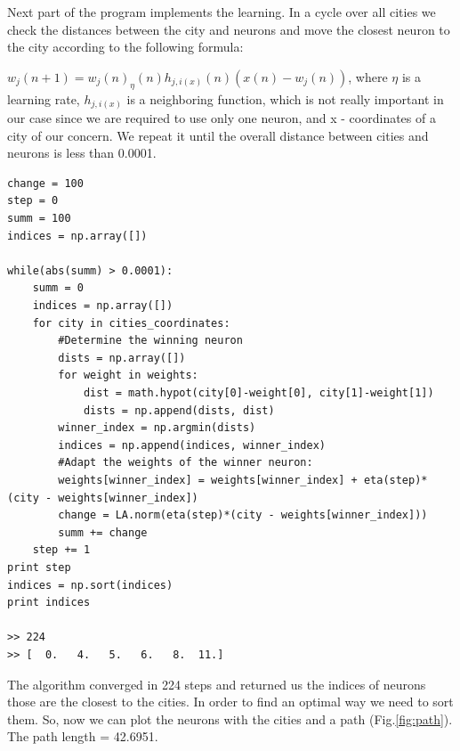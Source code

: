 \documentclass[a4paper, 12pt]{article}
\begin{document}
Next part of the program implements the learning. In a cycle over all cities we check the distances between the city and neurons and move the closest neuron to the city according to the following formula:

$w_j(n+1) = w_j(n) _ \eta(n) h_{j,i(x)}(n)(x(n) - w_j(n))$,
where $\eta$ is a learning rate, $h_{j,i(x)}$ is a neighboring function, which is not really important in our case since we are required to use only one neuron, and x - coordinates of a city of our concern. We repeat it until the overall distance between cities and neurons is less than 0.0001.


\lstset{language=Python}
\begin{lstlisting}[frame=single]
change = 100
step = 0
summ = 100
indices = np.array([])

while(abs(summ) > 0.0001):
    summ = 0
    indices = np.array([])
    for city in cities_coordinates:
        #Determine the winning neuron 
        dists = np.array([])
        for weight in weights:
            dist = math.hypot(city[0]-weight[0], city[1]-weight[1])
            dists = np.append(dists, dist)
        winner_index = np.argmin(dists)
        indices = np.append(indices, winner_index)
        #Adapt the weights of the winner neuron:
        weights[winner_index] = weights[winner_index] + eta(step)*(city - weights[winner_index])
        change = LA.norm(eta(step)*(city - weights[winner_index]))
        summ += change
    step += 1
print step
indices = np.sort(indices)
print indices

>> 224
>> [  0.   4.   5.   6.   8.  11.]
\end{lstlisting}

The algorithm converged in 224 steps and returned us the indices of neurons those are the closest to the cities. In order to find an optimal way we need to sort them. So, now we can plot the neurons with the cities and a path (Fig.\ref{fig:path}). The path length = 42.6951.
\end{document}
